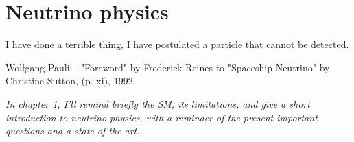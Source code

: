 \chapter{Neutrino physics}
\label{sec:neutrino}

\epigraph{I have done a terrible thing, I have postulated a particle that cannot be detected.}{Wolfgang Pauli -- "Foreword" by Frederick Reines to "Spaceship Neutrino" by Christine Sutton, (p. xi), 1992. }

\textit{In chapter 1, I'll remind briefly the SM, its limitations, and give a short introduction to neutrino physics, with a reminder of the present important questions and a state of the art.}


%
%
%
%
%
%
%
%
%
%
